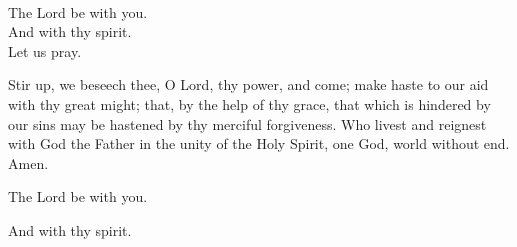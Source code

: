 \\
  \rubric{\Vbar}The Lord be with you.
\\
  \rubric{\Rbar}And with thy spirit.
\\
Let us pray.

Stir up, we beseech thee, O Lord, thy power, and come; make haste to our aid with thy great might; that, by the help of thy grace, that which is hindered by our sins may be hastened by thy merciful forgiveness. Who livest and reignest with God the Father in the unity of the Holy Spirit, one God, world without end.\rubric{\Rbar} Amen.

  \rubric{\Vbar}The Lord be with you.

  \rubric{\Rbar}And with thy spirit.
